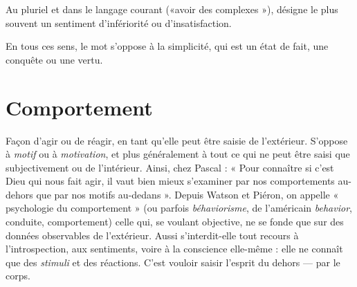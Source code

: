 Au pluriel et dans le langage courant («avoir des complexes »), désigne le
plus souvent un sentiment d’infériorité ou d’insatisfaction.

En tous ces sens, le mot s’oppose à la simplicité, qui est un état de fait, une
conquête ou une vertu.

\section{Comportement}
Façon d’agir ou de réagir, en tant qu’elle peut être
saisie de l’extérieur. S’oppose à {\it motif} ou à {\it motivation},
et plus généralement à tout ce qui ne peut être saisi que subjectivement ou de
l’intérieur. Ainsi, chez Pascal : « Pour connaître si c’est Dieu qui nous fait agir,
il vaut bien mieux s’examiner par nos comportements au-dehors que par nos
motifs au-dedans ». Depuis Watson et Piéron, on appelle « psychologie du
comportement » (ou parfois {\it béhaviorisme}, de l'américain {\it behavior}, conduite,
comportement) celle qui, se voulant objective, ne se fonde que sur des données
observables de l'extérieur. Aussi s’interdit-elle tout recours à l’introspection,
aux sentiments, voire à la conscience elle-même : elle ne connaît que des {\it stimuli}
et des réactions. C’est vouloir saisir l’esprit du dehors — par le corps.

